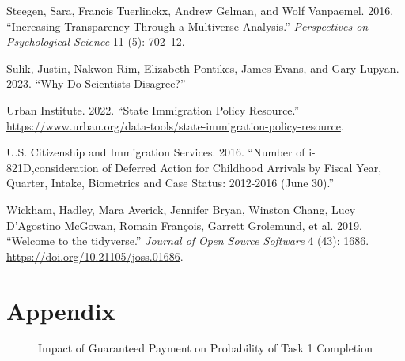 \documentclass[
  letterpaper,
  DIV=11,
  numbers=noendperiod]{scrartcl}
\newlength{\cslhangindent}
\newenvironment{CSLReferences}[2] %
 {\begin{list}{}{%
  \setlength{\itemindent}{0pt}
  \setlength{\leftmargin}{0pt}
  \setlength{\parsep}{0pt}
  \ifodd #1
   \setlength{\leftmargin}{\cslhangindent}
   \setlength{\itemindent}{-1\cslhangindent}
  \fi
  \setlength{\itemsep}{#2\baselineskip}}}
 {\end{list}}
\begin{document}
\begin{CSLReferences}{1}{0}
Steegen, Sara, Francis Tuerlinckx, Andrew Gelman, and Wolf Vanpaemel.
2016. {``Increasing Transparency Through a Multiverse Analysis.''}
\emph{Perspectives on Psychological Science} 11 (5): 702--12.

Sulik, Justin, Nakwon Rim, Elizabeth Pontikes, James Evans, and Gary
Lupyan. 2023. {``Why Do Scientists Disagree?''}

Urban Institute. 2022. {``State Immigration Policy Resource.''}
\url{https://www.urban.org/data-tools/state-immigration-policy-resource}.

U.S. Citizenship and Immigration Services. 2016. {``Number of
i-821D,consideration of Deferred Action for Childhood Arrivals by Fiscal
Year, Quarter, Intake, Biometrics and Case Status: 2012-2016 (June
30).''}

Wickham, Hadley, Mara Averick, Jennifer Bryan, Winston Chang, Lucy
D'Agostino McGowan, Romain François, Garrett Grolemund, et al. 2019.
{``Welcome to the {tidyverse}.''} \emph{Journal of Open Source Software}
4 (43): 1686. \url{https://doi.org/10.21105/joss.01686}.

\end{CSLReferences}

\FloatBarrier

\appendix

\section*{Appendix}\label{appendix}

\begin{figure}


\caption{\label{fig-rdd}Impact of Guaranteed Payment on Probability of
Task 1 Completion}

\end{figure}%
\end{document}
